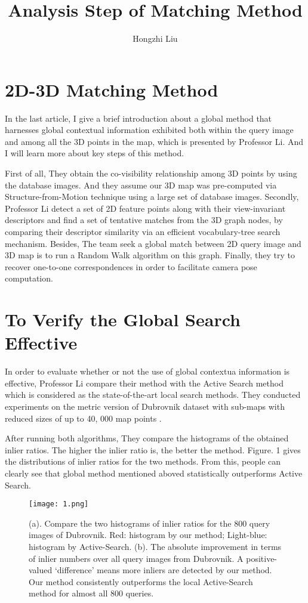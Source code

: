 \documentclass{article}
\author{Hongzhi Liu}
\title{Analysis Step of Matching Method}
\begin{document}
\maketitle
\par	
\section{2D-3D Matching Method}
    In the last article, I give a brief introduction about a global method that harnesses global contextual information exhibited both within the query image and among all the 3D points in the map, which is presented by Professor Li. And I will learn more about key steps of this method.
    
    First of all, They obtain the co-visibility relationship among 3D points by using the database images. And they assume our 3D map was pre-computed via Structure-from-Motion technique using a large set of database images. Secondly, Professor Li detect a set of 2D feature points along with their view-invariant descriptors and find a set of tentative matches from the 3D graph nodes, by comparing their descriptor similarity via an efficient vocabulary-tree search mechanism. Besides, The team seek a global match between 2D query image and 3D map is to run a Random Walk algorithm on this graph. Finally, they try to recover one-to-one correspondences in order to facilitate camera pose computation.

	
	\section{To Verify the Global Search Effective}
	
    In order to evaluate whether or not the use of global contextua information is effective, Professor Li compare their method with the Active Search method which is considered as the state-of-the-art local search methods. They conducted experiments on the metric version of Dubrovnik dataset with sub-maps with reduced sizes of up to 40, 000 map points \cite{Liu2017Efficient}.
    
    After running both algorithms, They compare the histograms of the obtained inlier ratios. The higher the inlier ratio is, the better the method. Figure. 1 gives the distributions of inlier ratios for the two methods. From this, people can clearly see that global method mentioned aboved statistically outperforms Active Search.

\begin{figure}[ht]
		\centering
		\texttt{[image: 1.png]}
		\caption{(a). Compare the two histograms of inlier ratios for the 800 query images of Dubrovnik. Red: histogram by our method; Light-blue: histogram by Active-Search. (b). The absolute improvement in terms of inlier numbers over all query images from Dubrovnik. A positive-valued ‘difference’ means more inliers are detected by our method. Our method consistently outperforms the local Active-Search method for almost all 800 queries.}
\end{figure}


\end{document}
